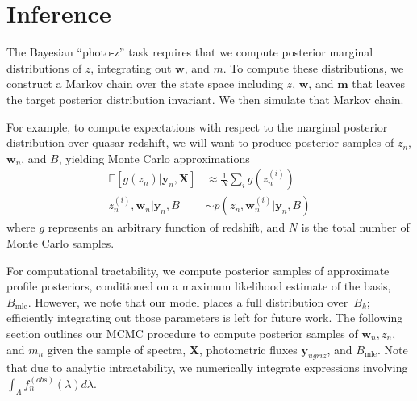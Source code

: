 \documentclass{article}
\begin{document}
\section{Inference}
\label{sec:inference}
The Bayesian ``photo-z'' task requires that we compute posterior marginal distributions of $z$, integrating out $\mathbf{w}$, and $m$.  
To compute these distributions, we construct a Markov chain over the state space including $z$, $\mathbf{w}$, and $\mathbf{m}$ that leaves the target posterior distribution invariant.
We then simulate that Markov chain.  
 
For example, to compute expectations with respect to the marginal posterior distribution over quasar redshift, we will want to produce posterior samples of $z_n$, $\mathbf{w}_n$, and $B$, yielding Monte Carlo approximations
\begin{align}
  \mathbb{E}[ g(z_n) | \mathbf{y}_n, \mathbf{X} ] 
    &\approx \frac{1}{N} \sum_{i} g(z_n^{(i)}) \\
    z_n^{(i)}, \mathbf{w}_n | \mathbf{y}_n, B &\sim p(z_n, \mathbf{w}_n^{(i)} | \mathbf{y}_n, B) 
\end{align}
where $g$ represents an arbitrary function of redshift, and $N$ is the total number of Monte Carlo samples.  

For computational tractability, we compute posterior samples of approximate profile posteriors, conditioned on a maximum likelihood estimate of the basis,~$B_{\text{mle}}$. 
However, we note that our model places a full distribution over~$B_k$; efficiently integrating out those parameters is left for future work.
The following section outlines our MCMC procedure to compute posterior samples of $\mathbf{w}_n, z_n$, and $m_n$ given the sample of spectra, $\mathbf{X}$, photometric fluxes $\mathbf{y}_{ugriz}$, and $B_{\text{mle}}$.
Note that due to analytic intractability, we numerically integrate expressions involving $\int_\Lambda f_n^{(obs)}(\lambda) d\lambda$.
\end{document}
